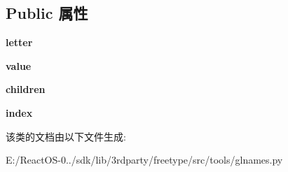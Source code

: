 \subsection*{Public 属性}
\begin{DoxyCompactItemize}
\item 
\mbox{\label{classglnames_1_1_string_node_a12c9360d42e3430603df983cc355d78c}} 
{\bfseries letter}
\item 
\mbox{\label{classglnames_1_1_string_node_aab7ade42e54748a63e96e81227b95958}} 
{\bfseries value}
\item 
\mbox{\label{classglnames_1_1_string_node_abf8942a8746b3f0fe4230d3e79ab6f77}} 
{\bfseries children}
\item 
\mbox{\label{classglnames_1_1_string_node_aa4e07c3aff8f165cb9c84505a61bbaed}} 
{\bfseries index}
\end{DoxyCompactItemize}


该类的文档由以下文件生成\+:\begin{DoxyCompactItemize}
\item 
E\+:/\+React\+O\+S-\/0../sdk/lib/3rdparty/freetype/src/tools/glnames.\+py\end{DoxyCompactItemize}
